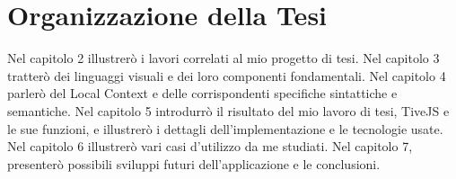     \section{Organizzazione della Tesi}
        Nel capitolo 2 illustrerò i lavori correlati al mio progetto di tesi.
        Nel capitolo 3 tratterò dei linguaggi visuali e dei loro componenti fondamentali. Nel capitolo 4 parlerò del Local Context e delle corrispondenti specifiche sintattiche e semantiche. Nel capitolo 5 introdurrò il risultato del mio lavoro di tesi, TiveJS e le sue funzioni, e illustrerò  i dettagli dell'implementazione e le tecnologie usate. Nel capitolo 6 illustrerò vari casi d'utilizzo da me studiati. Nel capitolo 7, presenterò possibili sviluppi futuri dell'applicazione e le conclusioni.